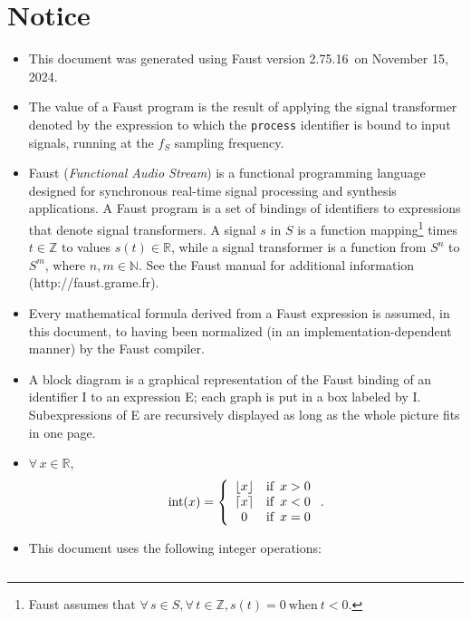 \documentclass{article}
\newcommand{\faustversion}{2.75.16}
\newcommand{\faustdocdate}{November 15, 2024}
\begin{document}
 \section{Notice} \label{notice}  
\begin{itemize}
	\item This document was generated using Faust version \faustversion\ on \faustdocdate.
	\item The value of a Faust program is the result of applying the signal transformer denoted by the expression to which the \texttt{process} identifier is bound to input signals, running at the $f_S$ sampling frequency.
	\item Faust (\emph{Functional Audio Stream}) is a functional programming language designed for synchronous real-time signal processing and synthesis applications. A Faust program is a set of bindings of identifiers to expressions that denote signal transformers. A signal $s$ in $S$ is a function mapping\footnote{Faust assumes that $\forall \, s \in S, \forall \, t \in \mathbb{Z}, s(t) = 0 \mathrm{\ when\ } t < 0$.} times $t \in \mathbb{Z}$ to values $s(t) \in \mathbb{R}$, while a signal transformer is a function from $S^n$ to $S^m$, where $n,m\in \mathbb{N}$. See the Faust manual for additional information (\textsf{http://faust.grame.fr}).
	\item Every mathematical formula derived from a Faust expression is assumed, in this document, to having been normalized (in an implementation-depen\-dent manner) by the Faust compiler.
	\item A block diagram is a graphical representation of the Faust binding of an identifier I to an expression E; each graph is put in a box labeled by I. Subexpressions of E are recursively displayed as long as the whole picture fits in one page.
	\item $\forall \, x \in \mathbb{R}$, 
	\begin{displaymath}
		\mathrm{int}(x) =
		\left\{\begin{array}{cl}
			\lfloor x \rfloor & \mbox{if \,} x > 0 \\
			\lceil x \rceil & \mbox{if \,} x < 0 \\
			0 & \mbox{if \,} x = 0 \\
		\end{array}\right..
	\end{displaymath}
	\item 
		This document uses the following integer operations:
	\begin{center}
	\begin{tabular}{|c|l|l|} 

\end{tabular}
\end{center}
\end{itemize}
\end{document}
